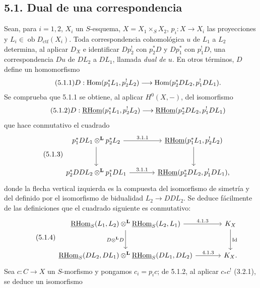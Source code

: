 \subsection*{5.1. Dual de una correspondencia}

Sean, para $i=1,2$, $X_i$ un $S$-esquema, $X=X_1\times_S X_2$, $p_i:X\to X_i$ las proyecciones y $L_i\in\operatorname{ob}D_{\mathrm{ctf}}(X_i)$. Toda correspondencia cohomológica $u$ de $L_1$ a $L_2$ determina, al aplicar $D_X$ e identificar $Dp_2^!$ con $p_2^*D$ y $Dp_1^*$ con $p_1^!D$, una correspondencia $Du$ de $DL_2$ a $DL_1$, llamada \emph{dual de $u$}. En otros términos, $D$ define un homomorfismo
\begin{equation}
\tag{5.1.1}
D:\operatorname{Hom}(p_1^*L_1,p_2^!L_2)\longrightarrow \operatorname{Hom}(p_2^*DL_2,p_1^!DL_1).
\end{equation}
Se comprueba que 5.1.1 se obtiene, al aplicar $H^0(X,-)$, del isomorfismo
\begin{equation}
\tag{5.1.2}
D:\underline{\mathrm{RHom}}(p_1^*L_1,p_2^!L_2)\longrightarrow\underline{\mathrm{RHom}}(p_2^*DL_2,p_1^!DL_1)
\end{equation}
que hace conmutativo el cuadrado
\begin{equation}
\tag{5.1.3}
\begin{tikzcd}[column sep=large,row sep=large]
p_1^*DL_1\otimes^{\mathbf L}p_2^*L_2 \arrow[r,"3.1.1"] \arrow[d]
& \uRHom(p_1^*L_1,p_2^!L_2) \arrow[d] \\
p_2^*DDL_2\otimes^{\mathbf L}p_1^*DL_1 \arrow[r,"3.1.1"]
& \uRHom(p_2^*DL_2,p_1^!DL_1),
\end{tikzcd}
\end{equation}
donde la flecha vertical izquierda es la compuesta del isomorfismo de simetría y del definido por el isomorfismo de bidualidad $L_2\to DDL_2$. Se deduce fácilmente de las definiciones que el cuadrado siguiente es conmutativo:
\begin{equation}
\tag{5.1.4}
\begin{tikzcd}[column sep=large,row sep=large]
\uRHom_S(L_1,L_2)\otimes^{\mathbf L}\uRHom_S(L_2,L_1) \arrow[r,"4.1.3"] \arrow[d,"D\otimes^{\mathbf L} D"']
& K_X \arrow[d,"\operatorname{Id}"] \\
\uRHom_S(DL_2,DL_1)\otimes^{\mathbf L}\uRHom_S(DL_1,DL_2) \arrow[r,"4.1.3"]
& K_X.
\end{tikzcd}
\end{equation}
Sea $c:C\to X$ un $S$-morfismo y pongamos $c_i=p_ic$; de 5.1.2, al aplicar $c_*c^!$ (3.2.1), se deduce un isomorfismo
